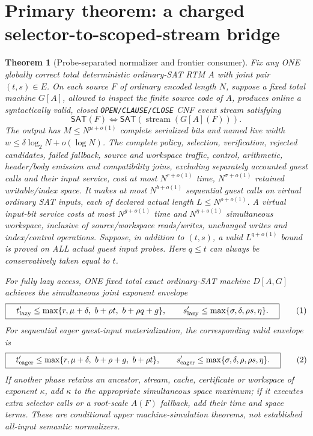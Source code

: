 \documentclass[11pt]{article}
\newtheorem{theorem}{Theorem}
\newcommand{\SAT}{\mathsf{SAT}}
\begin{document}
\section{Primary theorem: a charged selector-to-scoped-stream bridge}
\begin{theorem}[Probe-separated normalizer and frontier consumer]
Fix any ONE globally correct total deterministic ordinary-SAT RTM $A$
with joint pair $(t,s)\in E$. On each source $F$ of ordinary encoded
length $N$, suppose a fixed total machine $G[A]$, allowed to inspect
the finite source code of $A$, produces online a syntactically valid,
closed \texttt{OPEN/CLAUSE/CLOSE} CNF event stream satisfying
\[
  \SAT(F)\iff\SAT(\operatorname{stream}(G[A](F))).
\]
The output has $M\le N^{\mu+o(1)}$ complete serialized bits and named
live width $w\le\delta\log_2 N+o(\log N)$.
The \emph{complete} policy, selection, verification, rejected candidates,
failed fallback, source and workspace traffic, control, arithmetic,
header/body emission and compatibility joins, excluding separately
accounted guest calls and their input service, cost at most
$N^{r+o(1)}$ time, $N^{\sigma+o(1)}$ retained writable/index space.
It makes at most $N^{b+o(1)}$ \emph{sequential} guest calls on
\emph{virtual ordinary SAT} inputs, each of declared actual length
$L\le N^{\rho+o(1)}$. A virtual input-bit service costs at most
$N^{g+o(1)}$ time and $N^{\eta+o(1)}$ simultaneous workspace,
inclusive of source/workspace reads/writes, unchanged writes and
index/control operations. Suppose, \emph{in addition to} $(t,s)$,
a valid $L^{q+o(1)}$ bound is proved on ALL actual guest input probes.
Here $q\le t$ can always be conservatively taken equal to $t$.

For fully lazy access, ONE fixed total exact ordinary-SAT machine
$D[A,G]$ achieves the simultaneous joint exponent envelope
\[
\boxed{\quad
 t_{\rm lazy}'\le\max\{r,\mu+\delta,\ b+\rho t,\ b+\rho q+g\},\qquad
 s_{\rm lazy}'\le\max\{\sigma,\delta,\rho s,\eta\}.
 \quad} \tag{1}
\]
For sequential eager guest-input materialization, the corresponding
valid envelope is
\[
\boxed{\quad
 t_{\rm eager}'\le\max\{r,\mu+\delta,\ b+\rho+g,\ b+\rho t\},\qquad
 s_{\rm eager}'\le\max\{\sigma,\delta,\rho,\rho s,\eta\}.
 \quad} \tag{2}
\]
If another phase retains an ancestor, stream, cache, certificate or
workspace of exponent $\kappa$, add $\kappa$ to the \emph{appropriate
simultaneous} space maximum; if it executes extra selector calls or a
root-scale $A(F)$ fallback, add their time and space terms.
These are conditional upper \emph{machine-simulation} theorems,
not established all-input semantic normalizers.
\end{theorem}
\end{document}
